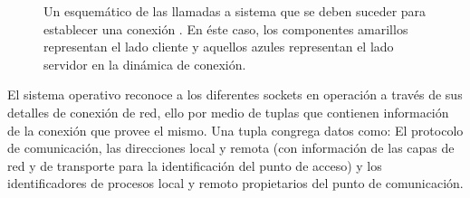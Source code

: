 \begin{figure}[h!]
	\centering
	\hspace*{\fill}
	\hfill
	\caption{Un esquemático de las llamadas a sistema que se deben suceder para establecer una conexión \cite{book:sockets}. En éste caso, los componentes amarillos representan el lado cliente y aquellos azules representan el lado servidor en la dinámica de conexión.}
	\label{fig:socketHandshake}
	\hspace*{\fill}
\end{figure}


El sistema operativo reconoce a los diferentes sockets en operación a través de sus detalles de conexión de red, ello por medio de tuplas que contienen información de la conexión que provee el mismo. Una tupla congrega datos como: El protocolo de comunicación, las direcciones local y remota (con información de las capas de red y de transporte para la identificación del punto de acceso) y los identificadores de procesos local y remoto propietarios del punto de comunicación.

